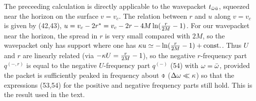 The preceeding calculation is directly applicable to the
wavepacket $t_{\bar{\omega}\bar{u}}$, squeezed near the horizon on
the surface $v=v_c$.
The relation between $r$ and $u$ along $v=v_c$ is given by
(42,43), $u=v_c-2r^*=v_c-2r-4M\ln({r\over2M}-1)$. For our
wavepacket near the horizon, the spread in $r$ is very small
compared with $2M$, so the wavepacket only has support where
one has $\kappa u\simeq-\ln({r\over 2M}-1)+{\rm const.}$.
Thus $U$ and $r$ are linearly related
(via $-\kappa U={r\over 2M}-1$), so the negative $r$-frequency
part $q^{\scriptscriptstyle(-,r)}$ is equal to the negative
$U$-frequency part $q^{\scriptscriptstyle(-)}$ (54) with
$\omega=\bar{\omega}$, provided the packet is sufficiently peaked in
frequency about $\obar$ ($\Delta\omega\ll\kappa$) so that the
expressions (53,54) for the positive and negative frequency
parts still hold.
This is the result used in the text.


